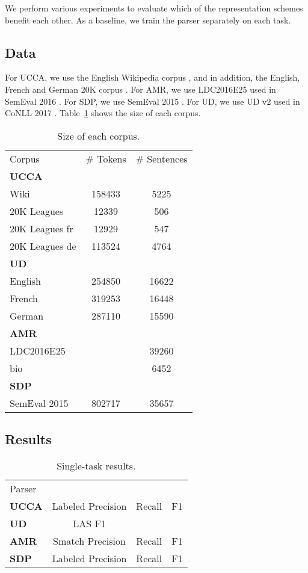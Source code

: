 \documentclass[11pt,a4paper]{article}
\begin{document}
We perform various experiments to evaluate which of the representation schemes benefit each other.
As a baseline, we train the parser separately on each task.

\subsection{Data}

For UCCA, we use the English Wikipedia corpus \cite{abend2013universal},
and in addition, the English, French and German 20K corpus \cite{sulem2015conceptual}.
For AMR, we use LDC2016E25 used in SemEval 2016 \cite{may2017semeval}.
For SDP, we use SemEval 2015 \cite{oepen2015semeval}.
For UD, we use UD v2 used in CoNLL 2017 \cite{zeman2017conll}.
Table~\ref{tab:corpora} shows the size of each corpus.

\begin{table}\label{tab:corpora}
\begin{tabular}{lcc}
Corpus & \# Tokens & \# Sentences \\
\textbf{UCCA} \\
Wiki & 158433 & 5225 \\
20K Leagues & 12339 & 506 \\
20K Leagues fr & 12929 & 547 \\
20K Leagues de & 113524 & 4764 \\
\textbf{UD} \\
English & 254850 & 16622 \\
French & 319253 & 16448 \\
German & 287110 & 15590 \\
\textbf{AMR} \\
LDC2016E25 &  & 39260 \\
bio &  & 6452 \\
\textbf{SDP} \\
SemEval 2015 & 802717 & 35657 \\
\end{tabular}
\caption{Size of each corpus.}
\end{table}

\subsection{Results}


\begin{table}\label{tab:single}
\begin{tabular}{lccc}
Parser \\
\textbf{UCCA} & Labeled Precision & Recall & F1 \\
\textbf{UD} & LAS F1 \\
\textbf{AMR} & Smatch Precision & Recall & F1 \\
\textbf{SDP} & Labeled Precision & Recall & F1 \\
\end{tabular}
\caption{Single-task results.}
\end{table}




\end{document}
